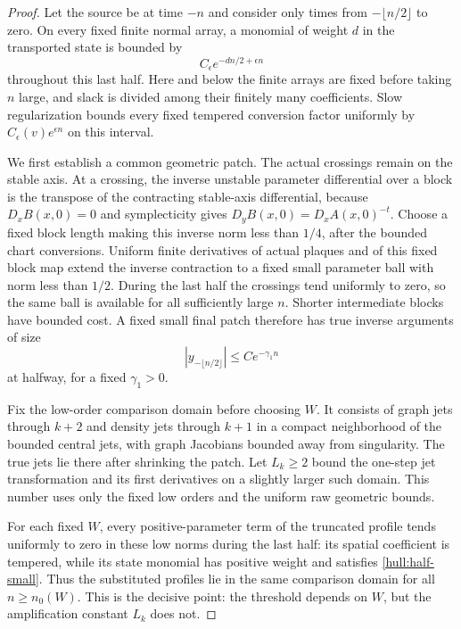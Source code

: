 \begin{proof}
Let the source be at time $-n$ and consider only times from
$-\lfloor n/2\rfloor$ to zero. On every fixed finite normal array,
a monomial of weight $d$ in the transported state is bounded by
\begin{equation}\label{hull:half-small}
 C_\epsilon e^{-dn/2+\epsilon n}
\end{equation}
throughout this last half. Here and below the finite arrays are fixed
before taking $n$ large, and slack is divided among their finitely many
coefficients. Slow regularization bounds every fixed tempered
conversion factor uniformly by $C_\epsilon(v)e^{\epsilon n}$ on
this interval.

We first establish a common geometric patch. The actual crossings
remain on the stable axis. At a crossing, the inverse unstable
parameter differential over a block is the transpose of the
contracting stable-axis differential, because $D_xB(x,0)=0$ and
symplecticity gives $D_yB(x,0)=D_xA(x,0)^{-t}$. Choose a fixed block
length making this inverse norm less than $1/4$, after the bounded
chart conversions. Uniform finite derivatives of actual plaques and
of this fixed block map extend the inverse contraction to a fixed
small parameter ball with norm less than $1/2$. During the last half
the crossings tend uniformly to zero, so the same ball is available
for all sufficiently large $n$. Shorter intermediate blocks have
bounded cost. A fixed small final patch therefore has true inverse
arguments of size
\begin{equation}\label{hull:half-arguments}
 |y_{-\lfloor n/2\rfloor}|\le C e^{-\gamma_1 n}
\end{equation}
at halfway, for a fixed $\gamma_1>0$.

Fix the low-order comparison domain before choosing $W$. It consists
of graph jets through $k+2$ and density jets through $k+1$ in a compact
neighborhood of the bounded central jets, with graph Jacobians bounded
away from singularity. The true jets lie there after shrinking the
patch. Let $L_k\ge2$ bound the one-step jet transformation and its
first derivatives on a slightly larger such domain. This number uses
only the fixed low orders and the uniform raw geometric bounds.

For each fixed $W$, every positive-parameter term of the truncated
profile tends uniformly to zero in these low norms during the last
half: its spatial coefficient is tempered, while its state monomial
has positive weight and satisfies \eqref{hull:half-small}. Thus the
substituted profiles lie in the same comparison domain for all
$n\ge n_0(W)$. This is the decisive point: the threshold depends on
$W$, but the amplification constant $L_k$ does not.


\end{proof}
